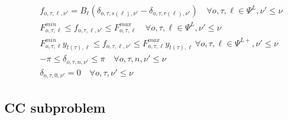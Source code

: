\documentclass[final]{IEEEtran}
\begin{document}
\begin{align}
&f_{o, \tau, \ell, \nu'} = B_\ell (\delta_{o, \tau, s(\ell), \nu'} - \delta_{o, \tau, r(\ell), \nu'}) \quad \forall o, \tau, \ell \in \Psi^L, \nu' \leq \nu \\
&F_{o, \tau, \ell}^{min} \leq f_{o, \tau, \ell, \nu'} \leq F_{o, \tau, \ell}^{max} \quad \forall o, \tau, \ell \in \Psi^L, \nu' \leq \nu \\
&F_{o, \tau, \ell}^{min} y_{t(\tau), \ell} \leq f_{o, \tau, \ell, \nu'} \leq F_{o, \tau, \ell}^{max} y_{t(\tau), \ell} \, \forall o, \tau, \ell \in \Psi^{L+}, \nu' \leq \nu \\
&-\pi \leq \delta_{o, \tau, n, \nu'} \leq \pi \quad \forall o, \tau, n, \nu' \leq \nu \\
&\label{master_last} \delta_{o, \tau, 0, \nu'} = 0 \quad \forall o, \tau, \nu' \leq \nu
\end{align}

\subsection{CC subproblem}
\end{document}
